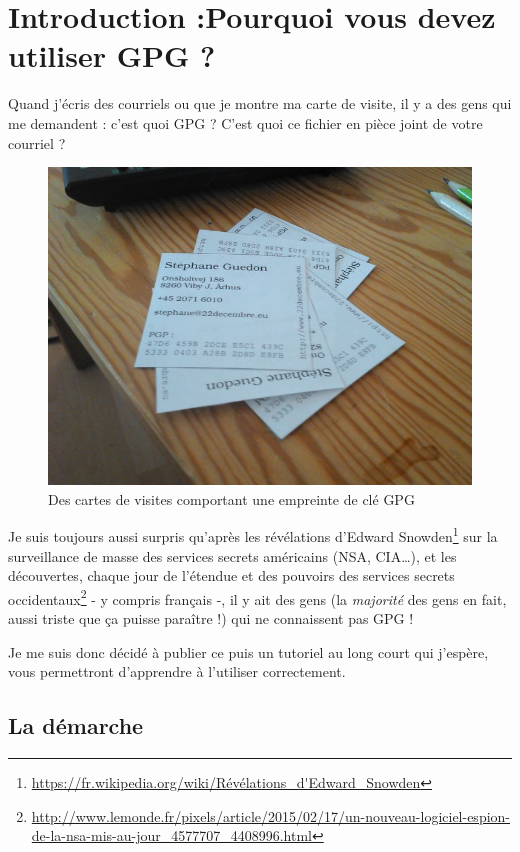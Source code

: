 \chapter{Introduction :Pourquoi vous devez utiliser GPG ?}

Quand j'écris des courriels ou que je montre ma carte de visite, il y a
des gens qui me demandent : c'est quoi GPG ? C'est quoi ce fichier en
pièce joint de votre courriel ?

\begin{figure}[tbph]
\centering
\includegraphics[width=\linewidth]{images/visiting.jpeg}
\caption{Des cartes de visites comportant une empreinte de clé GPG}
\end{figure}

Je suis toujours aussi surpris qu'après les révélations d'Edward 
Snowden\footnote{\url{https://fr.wikipedia.org/wiki/Révélations_d'Edward_Snowden}} sur la surveillance de masse des services secrets américains (NSA, CIA\ldots{}), et les découvertes, chaque jour de l'étendue et des pouvoirs des services secrets occidentaux\footnote{\url{http://www.lemonde.fr/pixels/article/2015/02/17/un-nouveau-logiciel-espion-de-la-nsa-mis-au-jour_4577707_4408996.html}} - y compris français -, il y ait des gens (la \emph{majorité} des gens en fait, aussi triste que ça puisse
paraître !) qui ne connaissent pas GPG !

Je me suis donc décidé à publier ce puis un tutoriel au long court qui j'espère, vous permettront d'apprendre à l'utiliser correctement.

\section{La démarche}\label{la-duxe9marche}

